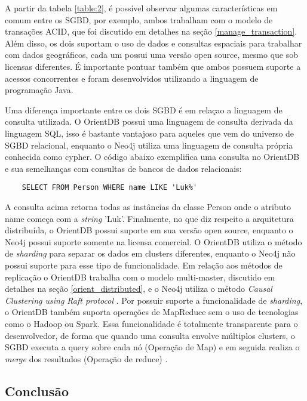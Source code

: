 	A partir da tabela \ref{table:2}, é possível observar algumas características em comum entre os SGBD, por exemplo, ambos trabalham com o modelo de transações ACID, que foi discutido em detalhes na seção \ref{manage_transaction}. Além disso, os dois suportam o uso de dados e consultas espaciais para trabalhar com dados geográficos, cada um possui uma versão open source, mesmo que sob licensas diferentes. É importante pontuar também que ambos possuem suporte a acessos concorrentes e foram desenvolvidos utilizando a linguagem de programação Java.
	
	Uma diferença importante entre os dois SGBD é em relaçao a linguagem de consulta utilizada. O OrientDB possui uma linguagem de consulta derivada da linguagem SQL, isso é bastante vantajoso para aqueles que vem do universo de SGBD relacional, enquanto o Neo4j utiliza uma linguagem de consulta própria conhecida como cypher. O código abaixo exemplifica uma consulta no OrientDB e sua semelhanças com consultas de bancos de dados relacionais:
	
\begin{lstlisting}
	SELECT FROM Person WHERE name LIKE 'Luk%'
\end{lstlisting}

	A consulta acima retorna todas as instâncias da classe Person onde o atributo name começa com a \textit{string} 'Luk'. Finalmente, no que diz respeito a arquitetura distribuída, o OrientDB possui suporte em sua versão open source, enquanto o Neo4j possui suporte somente na licensa comercial. O OrientDB utiliza o método de \textit{sharding} para separar os dados em clusters diferentes, enquanto o Neo4j não possui suporte para esse tipo de funcionalidade. Em relação aos métodos de replicação o OrientDB trabalha com o modelo multi-master, discutido em detalhes na seção \ref{orient_distributed}, e o Neo4j utiliza o método \textit{Causal Clustering using Raft protocol} \cite{neo4jcausal}. Por possuir suporte a funcionalidade de \textit{sharding}, o OrientDB também suporta operações de MapReduce sem o uso de tecnologias como o Hadoop ou Spark. Essa funcionalidade é totalmente transparente para o desenvolvedor, de forma que quando uma consulta envolve múltiplos clusters, o SGBD executa a query sobre cada nó (Operação de Map) e em seguida realiza o \textit{merge} dos resultados (Operação de reduce) \cite{orientMapReduce}.
	
\subsection{Conclusão}

